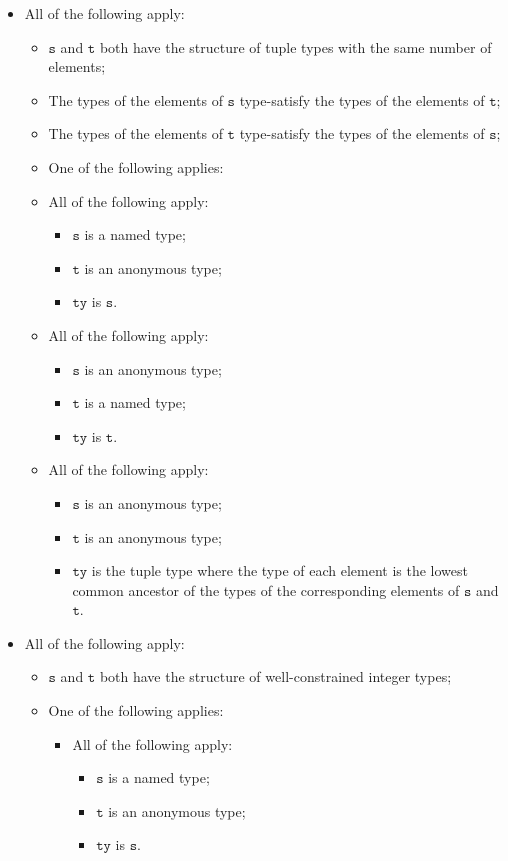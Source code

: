 \documentclass{book}
\newcommand\vt[0]{\texttt{t}}
\newcommand\vs[0]{\texttt{s}}
\newcommand\tty[0]{\texttt{ty}}
\begin{document}
\begin{itemize}
  \item All of the following apply:
    \begin{itemize}
    \item $\vs$ and $\vt$ both have the structure of tuple types with the same number of elements;
    \item The types of the elements of $\vs$ type-satisfy the types of the elements of $\vt$;
    \item The types of the elements of $\vt$ type-satisfy the types of the elements of $\vs$;
    \item One of the following applies:

      \item All of the following apply:
        \begin{itemize}
        \item $\vs$ is a named type;
        \item $\vt$ is an anonymous type;
        \item $\tty$ is $\vs$.
        \end{itemize}

      \item All of the following apply:
        \begin{itemize}
        \item $\vs$ is an anonymous type;
        \item $\vt$ is a named type;
        \item $\tty$ is $\vt$.
        \end{itemize}

     \item All of the following apply:
        \begin{itemize}
        \item $\vs$ is an anonymous type;
        \item $\vt$ is an anonymous type;
	\item $\tty$ is the tuple type where the type of each element is the lowest common
	  ancestor of the types of the corresponding elements of $\vs$ and $\vt$.
        \end{itemize}
    \end{itemize}

  \item All of the following apply:
    \begin{itemize}
    \item $\vs$ and $\vt$ both have the structure of well-constrained integer types;
    \item One of the following applies:
      \begin{itemize}
      \item All of the following apply:
        \begin{itemize}
        \item $\vs$ is a named type;
        \item $\vt$ is an anonymous type;
        \item $\tty$ is $\vs$.
        \end{itemize}


\end{itemize}
\end{itemize}
\end{itemize}
\end{document}
